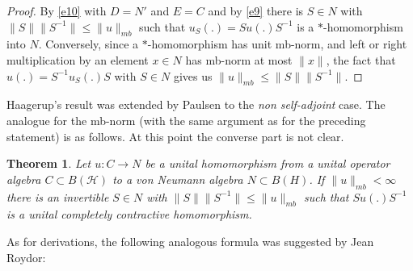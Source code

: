 \documentclass[11pt,leqno]{article}
\newcommand{\cl}[1]{\mathcal{#1}}
\theoremstyle{plain}
\newtheorem{thm}{Theorem}[section]
\theoremstyle{definition}
\theoremstyle{remark}
\numberwithin{equation}{section}
\begin{document}
    \begin{proof} By \eqref{e10}
    with $D={N}'$ and $E=C$  
    and by \eqref{e9}  there is $S\in N$ with
   $ \|S\|\| S^{-1}  \|\le \|u\|_{mb}$
    such that $u_S(.)=S u(.) S^{-1}$ is   a $*$-homomorphism into $N$.
    Conversely, since a  $*$-homomorphism has unit mb-norm,
    and left or right multiplication by an element  $x\in N$
    has mb-norm at most $\|x\|$, the fact that
     $u(.)=S^{-1}u_S(.)S$ with   $S\in N$ gives us
    $\|u\|_{mb} \le  \|S\|\| S^{-1}\| $.
     \end{proof}
     
     Haagerup's result was extended by Paulsen \cite{Pa}
     to the {\it non self-adjoint} case. The analogue for the mb-norm
     (with the same argument as for the preceding statement) is as follows. At this point the converse part is not clear.
    
      \begin{thm}\label{t1} Let $u: C \to {  N}$ be a unital homomorphism from a  unital operator algebra $C\subset B(\cl H)$  to a von Neumann algebra ${  N}\subset B(H)$.
  If $\|u\|_{mb}<\infty$ there is an invertible $S \in {  N}$
  with $\|S\|\| S^{-1}  \|\le \|u\|_{mb}   $
       such that $S u(.) S^{-1}$ is   a  unital completely contractive homomorphism.
    \end{thm}
      
     As for derivations,
       the following analogous formula was suggested by Jean Roydor:
     
\end{document}

